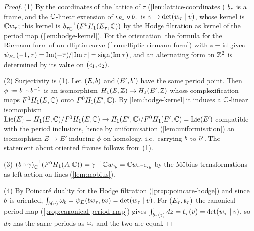 \begin{proof}
(1) By the coordinates of the lattice of $\tau$ (\cref{lem:lattice-coordinates})
$b_{\tau}$ is a frame, and the $\mathbb{C}$-linear extension of
$\iota_{E_{\tau}}\circ b_{\tau}$ is
$v \mapsto \det(w_{\tau}\mid v)$, whose kernel is
$\mathbb{C}w_{\tau}$; this kernel is
${b_{\tau}}_{\mathbb{C}}^{-1}(F^{0}H_{1}(E_{\tau},\mathbb{C}))$
by the Hodge filtration as kernel of the period map (\cref{lem:hodge-kernel}).
For the orientation, the formula for the Riemann form of an elliptic curve
(\cref{lem:elliptic-riemann-form}) with $z = \mathrm{id}$ gives
$\psi_{E_{\tau}}(-1, \tau) = \mathrm{Im}(-\overline{\tau})/|\mathrm{Im}\,\tau|
= \mathrm{sign}(\mathrm{Im}\,\tau)$, and an alternating form on
$\mathbb{Z}^{2}$ is determined by its value on $(e_{1},e_{2})$.

(2) Surjectivity is (1). Let $(E,b)$ and $(E', b')$ have the same
period point. Then $\phi := b'\circ b^{-1}$ is an isomorphism
$H_{1}(E,\mathbb{Z}) \to H_{1}(E',\mathbb{Z})$ whose complexification maps
$F^{0}H_{1}(E,\mathbb{C})$ onto $F^{0}H_{1}(E',\mathbb{C})$. By \cref{lem:hodge-kernel}
it induces a $\mathbb{C}$-linear isomorphism
$\mathrm{Lie}(E) = H_{1}(E,\mathbb{C})/F^{0}H_{1}(E,\mathbb{C}) \to
H_{1}(E',\mathbb{C})/F^{0}H_{1}(E',\mathbb{C}) = \mathrm{Lie}(E')$ compatible with the
period inclusions, hence by uniformisation (\cref{lem:uniformisation}) an
isomorphism $E \to E'$ inducing $\phi$ on homology, i.e.\ carrying $b$
to $b'$. The statement about oriented frames follows from (1).

(3) ${(b\circ\gamma)}_{\mathbb{C}}^{-1}(F^{0}H_{1}(A,\mathbb{C})) =
\gamma^{-1}\mathbb{C}w_{\tau_{b}} =
\mathbb{C}w_{\gamma^{-1}\tau_{b}}$ by the M\"obius
transformations as left action on lines (\cref{lem:mobius}).

(4) By Poincar\'e duality for the Hodge filtration
(\cref{prop:poincare-hodge}) and since $b$ is oriented,
$\int_{b(v)}\omega_{b} =
\psi_{E}(bw_{\tau}, b v) =
\det(w_{\tau}\mid v)$. For $(E_{\tau}, b_{\tau})$
the canonical period map (\cref{prop:canonical-period-map}) gives
$\int_{b_{\tau}(v)}dz = b_{\tau}(v) =
\det(w_{\tau}\mid v)$, so $dz$ has the same periods as
$\omega_{b}$ and the two are equal.
\end{proof}

